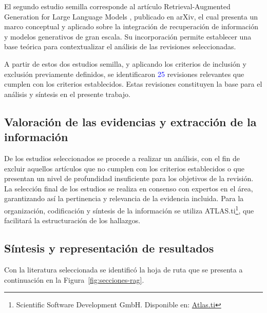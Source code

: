 El segundo estudio semilla corresponde al artículo Retrieval-Augmented Generation for Large Language Models \textcite{gao2023rag}, publicado en
arXiv,
el cual presenta un marco conceptual y aplicado sobre la integración de recuperación de información y modelos generativos de gran escala. Su incorporación permite 
establecer una base teórica para contextualizar el análisis de las revisiones seleccionadas.

A partir de estos dos estudios semilla, y aplicando los criterios de inclusión y exclusión previamente definidos, se identificaron \textcolor{blue}{25} revisiones 
relevantes que cumplen con los criterios establecidos. 
Estas revisiones constituyen la base para el análisis y síntesis en el presente trabajo.



\subsection{Valoración de las evidencias y extracción de la información}  
\label{subsec:valoracion-evidencias}
De los estudios seleccionados se procede a realizar un análisis,  
con el fin de excluir aquellos artículos que no cumplen con los criterios establecidos  
o que presentan un nivel de profundidad insuficiente para los objetivos de la revisión.  
La selección final de los estudios se realiza en consenso con expertos en el área,  
garantizando así la pertinencia y relevancia de la evidencia incluida.  
Para la organización, codificación y síntesis de la  
información se utiliza ATLAS.ti\footnote{Scientific Software Development GmbH. Disponible en: \href{https://atlasti.com/es}{Atlas.ti}},  
que facilitará la estructuración de los hallazgos.  





\subsection{Síntesis y representación de resultados}
\label{subsec:sintesis-resultados}
Con la literatura seleccionada se identificó la hoja de ruta que se presenta a continuación en la Figura~\ref{fig:secciones-rag}.


